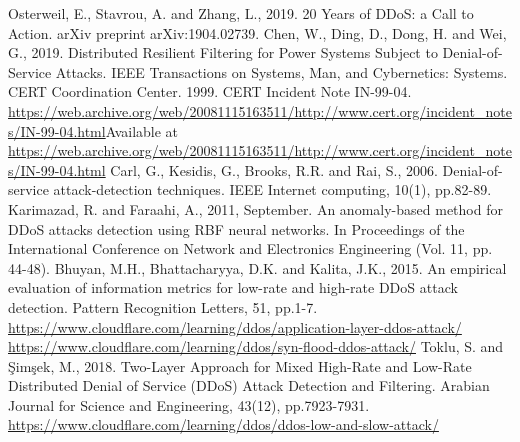 \documentclass[conference, a4paper]{IEEEtran}
\begin{document}
\begin{thebibliography}{00}
    Osterweil, E., Stavrou, A. and Zhang, L., 2019. 20 Years of DDoS: a Call to Action. arXiv preprint arXiv:1904.02739.
    Chen, W., Ding, D., Dong, H. and Wei, G., 2019. Distributed Resilient Filtering for Power Systems Subject to Denial-of-Service Attacks. IEEE Transactions on Systems, Man, and Cybernetics: Systems.
    CERT Coordination Center. 1999. CERT Incident Note IN-99-04. \url{https://web.archive.org/web/20081115163511/http://www.cert.org/incident_notes/IN-99-04.html}Available at \url{https://web.archive.org/web/20081115163511/http://www.cert.org/incident_notes/IN-99-04.html}
    Carl, G., Kesidis, G., Brooks, R.R. and Rai, S., 2006. Denial-of-service attack-detection techniques. IEEE Internet computing, 10(1), pp.82-89.
    Karimazad, R. and Faraahi, A., 2011, September. An anomaly-based method for DDoS attacks detection using RBF neural networks. In Proceedings of the International Conference on Network and Electronics Engineering (Vol. 11, pp. 44-48).
    Bhuyan, M.H., Bhattacharyya, D.K. and Kalita, J.K., 2015. An empirical evaluation of information metrics for low-rate and high-rate DDoS attack detection. Pattern Recognition Letters, 51, pp.1-7.
    \url{https://www.cloudflare.com/learning/ddos/application-layer-ddos-attack/}
    \url{https://www.cloudflare.com/learning/ddos/syn-flood-ddos-attack/}
    Toklu, S. and Şimşek, M., 2018. Two-Layer Approach for Mixed High-Rate and Low-Rate Distributed Denial of Service (DDoS) Attack Detection and Filtering. Arabian Journal for Science and Engineering, 43(12), pp.7923-7931.
    \url{https://www.cloudflare.com/learning/ddos/ddos-low-and-slow-attack/}
\end{thebibliography}

\vspace{12pt}
\end{document}
